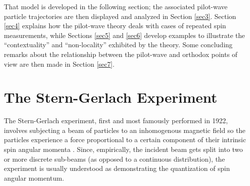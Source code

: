 \documentclass[aps,prc,onecolumn,letterpaper,floatfix,12pt]{revtex4}
\begin{document}
That model is developed in the following section; the associated
pilot-wave particle trajectories are then displayed and analyzed in Section
\ref{sec3}.  Section \ref{sec4} explains how the pilot-wave theory
deals with cases of repeated spin measurements, while Sections
\ref{sec5} and \ref{sec6} develop examples to illustrate the
``contextuality'' and ``non-locality'' exhibited by the theory.  Some
concluding remarks about the relationship between the pilot-wave and
orthodox points of view are then made in Section \ref{sec7}. 



\section{The Stern-Gerlach Experiment}
\label{sec2}

The Stern-Gerlach experiment, first and most famously performed in
1922, involves subjecting a beam of particles to an inhomogenous
magnetic field so the particles experience a force proportional to a
certain component of their intrinsic spin angular momenta \cite{sg}.  
Since, empirically, the incident beam gets split into two or more discrete
sub-beams (as opposed to a continuous distribution), the experiment is
usually understood as demonstrating the quantization of spin angular
momentum. 
\end{document}
